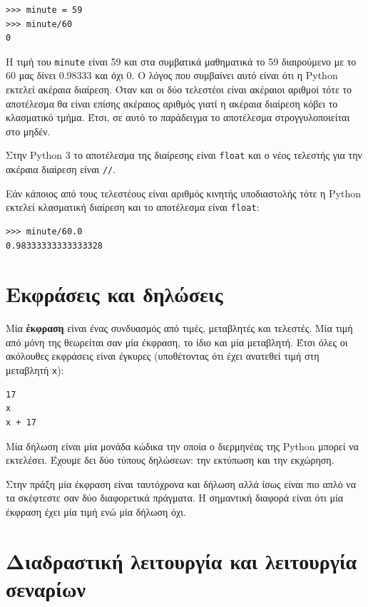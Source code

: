 \documentclass[10pt]{book}
\begin{document}
\begin{verbatim}
>>> minute = 59
>>> minute/60
0
\end{verbatim}
%

Η τιμή του {\tt minute} είναι 59 και στα συμβατικά μαθηματικά
το 59 διαιρούμενο με το 60 μας δίνει 0.98333 και όχι 0.  Ο λόγος που
συμβαίνει αυτό είναι ότι η  Python  εκτελεί ακέραια διαίρεση.  
Όταν και οι δύο τελεστέοι είναι ακέραιοι αριθμοί τότε το αποτέλεσμα θα είναι
επίσης ακέραιος αριθμός γιατί η ακέραια διαίρεση κόβει το κλασματικό
τμήμα.  Έτσι, σε αυτό το παράδειγμα το αποτέλεσμα στρογγυλοποιείται
στο μηδέν.


Στην Python 3 το αποτέλεσμα της διαίρεσης είναι {\tt float} και   
ο νέος τελεστής για την ακέραια διαίρεση είναι {\tt //}.

Εάν κάποιος από τους τελεστέους είναι αριθμός κινητής υποδιαστολής τότε 
η Python εκτελεί κλασματική διαίρεση και το αποτέλεσμα είναι
{\tt float}:

\begin{verbatim}
>>> minute/60.0
0.98333333333333328
\end{verbatim}


\section{Εκφράσεις και δηλώσεις}

Μία {\bf έκφραση} είναι ένας συνδυασμός από τιμές, μεταβλητές και τελεστές.  
Μία τιμή από μόνη της θεωρείται σαν μία έκφραση, το ίδιο και μία
μεταβλητή. Έτσι όλες οι ακόλουθες εκφράσεις είναι έγκυρες
(υποθέτοντας ότι έχει ανατεθεί τιμή στη μεταβλητή {\tt x}): 				

\begin{verbatim}
17
x
x + 17
\end{verbatim}
%

Μία δήλωση είναι μία μονάδα κώδικα την οποία ο διερμηνέας της Python 
μπορεί να εκτελέσει.  Έχουμε δει δύο τύπους δηλώσεων: την εκτύπωση
και την εκχώρηση.

Στην πράξη μία έκφραση είναι ταυτόχρονα και δήλωση αλλά ίσως είναι πιο
απλό να τα σκέφτεστε σαν δύο διαφορετικά πράγματα. Η σημαντική διαφορά
είναι ότι μία έκφραση έχει μία τιμή ενώ μία δήλωση όχι.


\section{Διαδραστική λειτουργία και λειτουργία σεναρίων}
\end{document}

